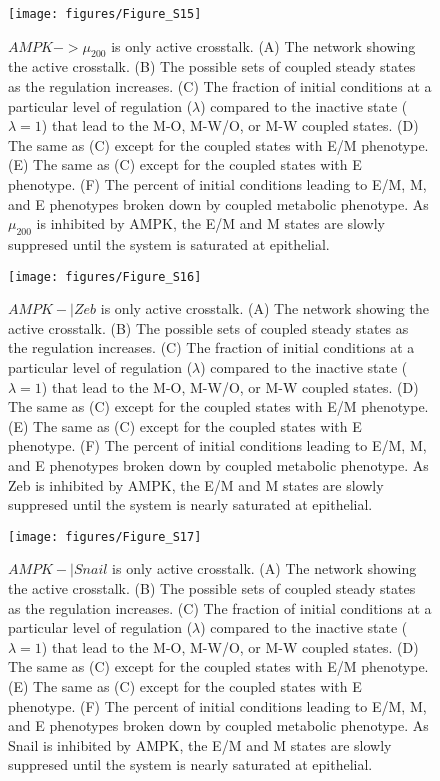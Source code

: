 \documentclass{article}
\begin{document}
\begin{figure}
\texttt{[image: figures/Figure\_S15]}
\caption{$AMPK -> \mu_{200}$ is only active crosstalk. (A) The network showing the active crosstalk. (B) The possible sets of coupled steady states as the regulation increases. (C) The fraction of initial conditions at a particular level of regulation ($\lambda$) compared to the inactive state ($\lambda=1$) that lead to the M-O, M-W/O, or M-W coupled states. (D) The same as (C) except for the coupled states with E/M phenotype. (E) The same as (C) except for the coupled states with E phenotype. (F) The percent of initial conditions leading to E/M, M, and E phenotypes broken down by coupled metabolic phenotype. As $\mu_{200}$  is inhibited by AMPK, the E/M and M states are slowly suppresed until the system is saturated at epithelial. }
\end{figure}




\begin{figure}
\texttt{[image: figures/Figure\_S16]}
\caption{$AMPK -| Zeb$ is only active crosstalk. (A) The network showing the active crosstalk. (B) The possible sets of coupled steady states as the regulation increases. (C) The fraction of initial conditions at a particular level of regulation ($\lambda$) compared to the inactive state ($\lambda=1$) that lead to the M-O, M-W/O, or M-W coupled states. (D) The same as (C) except for the coupled states with E/M phenotype. (E) The same as (C) except for the coupled states with E phenotype. (F) The percent of initial conditions leading to E/M, M, and E phenotypes broken down by coupled metabolic phenotype. As Zeb is inhibited by AMPK, the E/M and M states are slowly suppresed until the system is nearly saturated at epithelial. }
\end{figure}

\begin{figure}
\texttt{[image: figures/Figure\_S17]}
\caption{$AMPK -| Snail$ is only active crosstalk. (A) The network showing the active crosstalk. (B) The possible sets of coupled steady states as the regulation increases. (C) The fraction of initial conditions at a particular level of regulation ($\lambda$) compared to the inactive state ($\lambda=1$) that lead to the M-O, M-W/O, or M-W coupled states. (D) The same as (C) except for the coupled states with E/M phenotype. (E) The same as (C) except for the coupled states with E phenotype. (F) The percent of initial conditions leading to E/M, M, and E phenotypes broken down by coupled metabolic phenotype. As Snail is inhibited by AMPK, the E/M and M states are slowly suppresed until the system is nearly saturated at epithelial. }
\end{figure}
\end{document}
